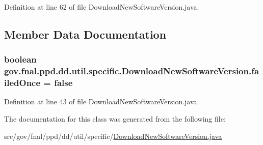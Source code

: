 Definition at line 62 of file Download\-New\-Software\-Version.\-java.



\subsection{Member Data Documentation}
\hypertarget{classgov_1_1fnal_1_1ppd_1_1dd_1_1util_1_1specific_1_1DownloadNewSoftwareVersion_ae1d1303e595c02f2a8f6879a90b035e0}{
\subsubsection[{failed\-Once}]{\setlength{\rightskip}{0pt plus 5cm}boolean gov.\-fnal.\-ppd.\-dd.\-util.\-specific.\-Download\-New\-Software\-Version.\-failed\-Once = false\hspace{0.3cm}{\ttfamily [static]}}}\label{classgov_1_1fnal_1_1ppd_1_1dd_1_1util_1_1specific_1_1DownloadNewSoftwareVersion_ae1d1303e595c02f2a8f6879a90b035e0}


Definition at line 43 of file Download\-New\-Software\-Version.\-java.



The documentation for this class was generated from the following file\-:\begin{DoxyCompactItemize}
\item 
src/gov/fnal/ppd/dd/util/specific/\hyperlink{DownloadNewSoftwareVersion_8java}{Download\-New\-Software\-Version.\-java}\end{DoxyCompactItemize}
